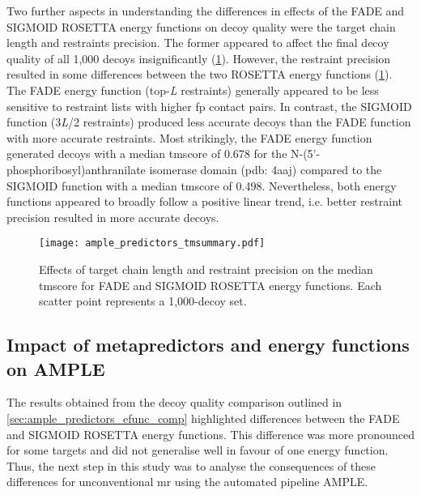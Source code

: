 Two further aspects in understanding the differences in effects of the FADE and SIGMOID ROSETTA energy functions on decoy quality were the target chain length and restraints precision. The former appeared to affect the final decoy quality of all 1,000 decoys insignificantly (\cref{fig:ample_predictor_tmsummary}). However, the restraint precision resulted in some differences between the two ROSETTA energy functions (\cref{fig:ample_predictor_tmsummary}). The FADE energy function (top-\textit{L} restraints) generally appeared to be less sensitive to restraint lists with higher \gls{fp} contact pairs.  In contrast, the SIGMOID function  (3\textit{L}/2 restraints) produced less accurate decoys than the FADE function with more accurate restraints. Most strikingly, the FADE energy function generated decoys with a median \gls{tmscore} of 0.678 for the N-(5'-phosphoribosyl)anthranilate isomerase domain (\gls{pdb}: 4aaj) compared to the SIGMOID function with a median \gls{tmscore} of 0.498. Nevertheless, both energy functions appeared to broadly follow a positive linear trend, i.e. better restraint precision resulted in more accurate decoys.

\begin{figure}[H]
    \centering
    \texttt{[image: ample\_predictors\_tmsummary.pdf]}
    \caption[Influence of target chain length and restraint precision on TM-score]{Effects of target chain length and restraint precision on the median \gls{tmscore} for FADE and SIGMOID ROSETTA energy functions. Each scatter point represents a 1,000-decoy set.}
    \label{fig:ample_predictor_tmsummary}
\end{figure}

\subsection{Impact of metapredictors and energy functions on AMPLE}
The results obtained from the decoy quality comparison outlined in \cref{sec:ample_predictors_efunc_comp} highlighted differences between the FADE and SIGMOID ROSETTA energy functions. This difference was more pronounced for some targets and did not generalise well in favour of one energy function. Thus, the next step in this study was to analyse the consequences  of these differences for unconventional \gls{mr} using the automated pipeline AMPLE.

